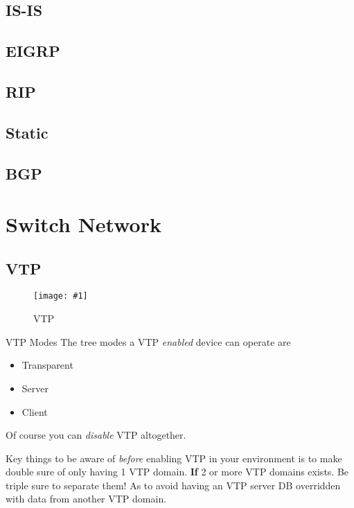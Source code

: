 \documentclass[a4paper,12pt,twoside,twocolumn]{book}
\newcommand{\fig}[4]{
\begin{figure}[h]
    \centering
    \texttt{[image: \#1]}
    \caption{#3}
    \label{fig:#2}
\end{figure}
}
\begin{document}
\subsection{IS-IS}
\subsection{EIGRP}
\subsection{RIP}
\subsection{Static}
\subsection{BGP}

\newpage

\section{Switch Network}

\subsection{VTP}
\fig{vtp/implementing-vtp}{imp-vtp1}{VTP}

\subsubsection{VTP Modes}
The tree modes a VTP \textit{enabled} device can operate are
\begin{itemize}
    \item Transparent
    \item Server
    \item Client
\end{itemize}
Of course you can \textit{disable} VTP altogether.

Key things to be aware of \textit{before} enabling VTP in your environment is to make double sure of only having 1 VTP domain. \textbf{If} 2 or more VTP domains exists. Be triple sure to separate them! As to avoid having an VTP server DB overridden with data from another VTP domain.
\end{document}

